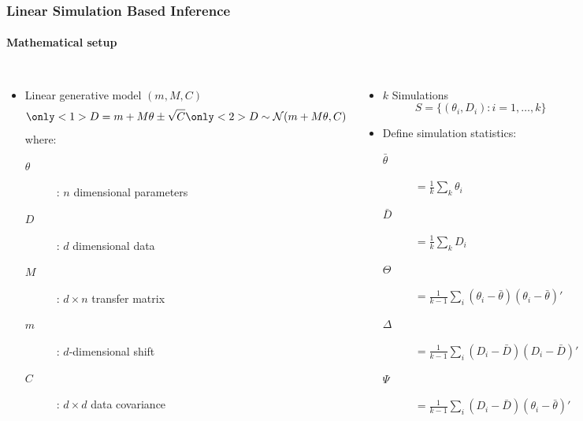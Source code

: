 \documentclass[aspectratio=169]{beamer}
\begin{document}
\begin{frame}
    \frametitle{Linear Simulation Based Inference}
    \framesubtitle{Mathematical setup}
    \begin{columns}[t]
        \begin{itemize}
            \item Linear generative model $(m,M,C)$
                \[ 
                    \only<1>{D = m + M \theta \pm \sqrt{C}}%
                    \only<2>{D \sim \mathcal{N}(m + M \theta, C)}%
                \]%
                where:
                \begin{description}
                    \item[$\theta$]: $n$ dimensional parameters
                    \item[$D$]: $d$ dimensional data
                    \item[$M$]: $d\times n$ transfer matrix
                    \item[$m$]: $d$-dimensional shift
                    \item[$C$]:  $d\times d$ data covariance
                \end{description}
        \end{itemize}
        
        \pause
        \begin{itemize}
            \item $k$ Simulations 
                \[
                    S=\{ (\theta_i,D_i): i=1,\ldots,k\}
                \]
            \item Define simulation statistics\footnotemark:

                \begin{description}
                    \item[$\bar\theta$] $= \tfrac{1}{k}\sum_k \theta_i$
                    \item[$\bar D$] $= \tfrac{1}{k}\sum_k D_i$
                    \item[$\Theta$] $=\tfrac{1}{k-1}\sum_i (\theta_i-\bar\theta)(\theta_i-\bar\theta)'$
                    \item[$\Delta$] $=\tfrac{1}{k-1}\sum_i (D_i-\bar D)(D_i-\bar D)'$
                    \item[$\Psi$] $=\tfrac{1}{k-1}\sum_i (D_i-\bar D)(\theta_i-\bar \theta)'$
                \end{description}
        \end{itemize}
    \end{columns}
\end{frame}
\end{document}
